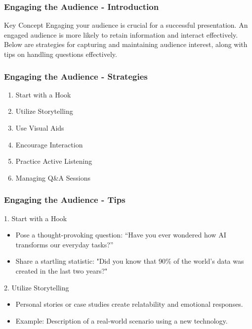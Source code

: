 \documentclass[aspectratio=169]{beamer}
\begin{document}
\begin{frame}[fragile]
    \frametitle{Engaging the Audience - Introduction}
    \begin{block}{Key Concept}
        Engaging your audience is crucial for a successful presentation. An engaged audience is more likely to retain information and interact effectively. Below are strategies for capturing and maintaining audience interest, along with tips on handling questions effectively.
    \end{block}
\end{frame}

\begin{frame}[fragile]
    \frametitle{Engaging the Audience - Strategies}
    \begin{enumerate}
        \item Start with a Hook
        \item Utilize Storytelling
        \item Use Visual Aids
        \item Encourage Interaction
        \item Practice Active Listening
        \item Managing Q\&A Sessions
    \end{enumerate}
\end{frame}

\begin{frame}[fragile]
    \frametitle{Engaging the Audience - Tips}
    \begin{block}{1. Start with a Hook}
        \begin{itemize}
            \item Pose a thought-provoking question: “Have you ever wondered how AI transforms our everyday tasks?”
            \item Share a startling statistic: "Did you know that 90\% of the world's data was created in the last two years?"
        \end{itemize}
    \end{block}
    
    \begin{block}{2. Utilize Storytelling}
        \begin{itemize}
            \item Personal stories or case studies create relatability and emotional responses.
            \item Example: Description of a real-world scenario using a new technology.
        \end{itemize}
    \end{block}
\end{frame}
\end{document}
